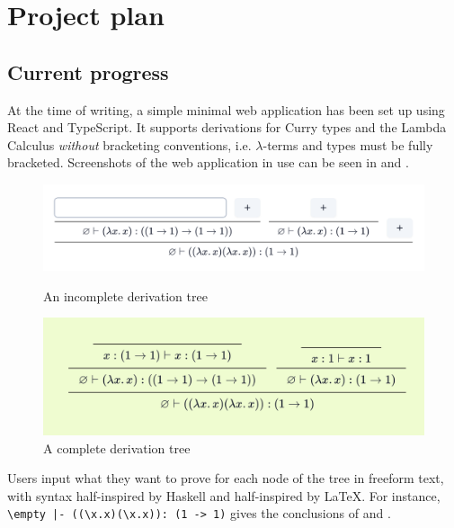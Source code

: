 \chapter{Project plan}
\section{Current progress}
At the time of writing, a simple minimal web application has been set up using React and TypeScript. It supports derivations for Curry types and the Lambda Calculus \textit{without} bracketing conventions, i.e. $\lambda$-terms and types must be fully bracketed. Screenshots of the web application in use can be seen in  and .

\begin{figure}[!htbp]
    \centering
    \begin{minipage}[t]{0.5\textwidth}
        \centering
        \includegraphics[width=\textwidth]{project/demo-incomplete.png}
        \caption{An incomplete derivation tree}
        \label{demo:incomplete}
    \end{minipage}\hfill
    \begin{minipage}[t]{0.5\textwidth}
        \centering
        \includegraphics[width=\textwidth]{project/demo-complete.png}
        \caption{A complete derivation tree}
        \label{demo:complete}
    \end{minipage}
\end{figure}

Users input what they want to prove for each node of the tree in freeform text, with syntax half-inspired by Haskell and half-inspired by \LaTeX{}. For instance, \texttt{\textbackslash empty |- ((\textbackslash x.x)(\textbackslash x.x)): (1 -> 1)} gives the conclusions of  and .

